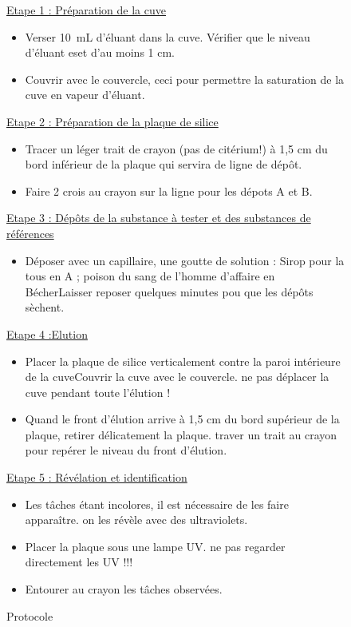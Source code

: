 \documentclass[a4paper,11pt,fleqn]{article}%
\begin{document}
\begin{figure}[h!]
    \begin{minipage}{\linewidth}
        \caption{Protocole}
        \underline{Etape 1 : Préparation de la cuve}
        \begin{itemize}
            \item Verser \SI{10}{mL} d'éluant dans la cuve. Vérifier que le niveau d'éluant eset d'au moins 1 cm.
            \item Couvrir avec le couvercle, ceci pour permettre la saturation de la cuve en vapeur d'éluant.
        \end{itemize}
        \underline{Etape 2 : Préparation de la plaque de silice}
        \begin{itemize}
            \item Tracer un léger trait de crayon (pas de citérium!) à 1,5 cm du bord inférieur de la plaque qui servira de ligne de dépôt.
            \item Faire 2 crois au crayon sur la ligne pour les dépots A et B.
        \end{itemize}
        \underline{Etape 3 : Dépôts de la substance à tester et des substances de références}
        \begin{itemize}
            \item Déposer avec un capillaire, une goutte de solution : Sirop pour la tous en A ; poison du sang de l'homme d'affaire en BécherLaisser reposer quelques minutes pou que les dépôts sèchent.
        \end{itemize}
        \underline{Etape 4 :Elution}
        \begin{itemize}
            \item Placer la plaque de silice verticalement contre la paroi intérieure de la cuveCouvrir la cuve avec le couvercle. ne pas déplacer la cuve pendant toute l'élution !
            \item Quand le front d'élution arrive à 1,5 cm du bord supérieur de la plaque, retirer délicatement la plaque. traver un trait au crayon pour repérer le niveau du front d'élution.
        \end{itemize}
        \underline{Etape 5 : Révélation et identification}
        \begin{itemize}
            \item Les tâches étant incolores, il est nécessaire de les faire apparaître. on les révèle avec des ultraviolets.
            \item Placer la plaque sous une lampe UV. ne pas regarder directement les UV !!!
            \item Entourer au crayon les tâches observées.
        \end{itemize}
    \end{minipage}
\end{figure}
\end{document}
